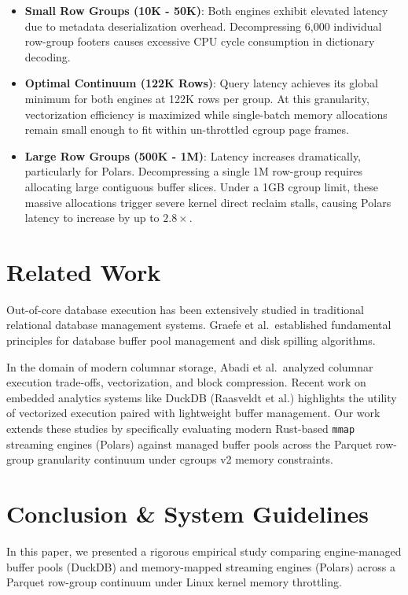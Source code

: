 \documentclass[sigconf,nonacm]{acmart}
\begin{document}
\begin{itemize}
    \item \textbf{Small Row Groups (10K - 50K)}: Both engines exhibit elevated latency due to metadata deserialization overhead. Decompressing 6,000 individual row-group footers causes excessive CPU cycle consumption in dictionary decoding.
    \item \textbf{Optimal Continuum (122K Rows)}: Query latency achieves its global minimum for both engines at 122K rows per group. At this granularity, vectorization efficiency is maximized while single-batch memory allocations remain small enough to fit within un-throttled cgroup page frames.
    \item \textbf{Large Row Groups (500K - 1M)}: Latency increases dramatically, particularly for Polars. Decompressing a single 1M row-group requires allocating large contiguous buffer slices. Under a 1GB cgroup limit, these massive allocations trigger severe kernel direct reclaim stalls, causing Polars latency to increase by up to $2.8\times$.
\end{itemize}

\section{Related Work}
Out-of-core database execution has been extensively studied in traditional relational database management systems. Graefe et al.\ established fundamental principles for database buffer pool management and disk spilling algorithms.

In the domain of modern columnar storage, Abadi et al.\ analyzed columnar execution trade-offs, vectorization, and block compression. Recent work on embedded analytics systems like DuckDB (Raasveldt et al.) highlights the utility of vectorized execution paired with lightweight buffer management. Our work extends these studies by specifically evaluating modern Rust-based \texttt{mmap} streaming engines (Polars) against managed buffer pools across the Parquet row-group granularity continuum under cgroups v2 memory constraints.

\section{Conclusion \& System Guidelines}
In this paper, we presented a rigorous empirical study comparing engine-managed buffer pools (DuckDB) and memory-mapped streaming engines (Polars) across a Parquet row-group continuum under Linux kernel memory throttling.
\end{document}
